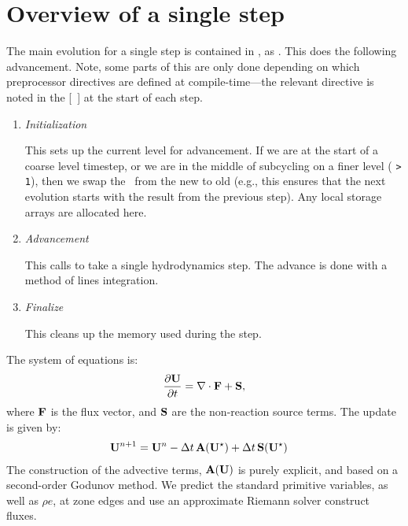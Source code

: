 
\section{Overview of a single step}
\label{flow:sec:nosdc}

The main evolution for a single step is contained in
, as .  This does
the following advancement.  Note, some parts of this are only done
depending on which preprocessor directives are defined at
compile-time---the relevant directive is noted in the [\ ] at the start
of each step.

\begin{enumerate}
\item {\em Initialization} 

  This sets up the current level for advancement.  If we are at the
  start of a coarse level timestep, or we are in the middle of
  subcycling on a finer level ( {\tt > 1}), then
  we swap the \statedata\ from the new to old (e.g., this ensures that
  the next evolution starts with the result from the previous step).
  Any local storage arrays are allocated here.

\item {\em Advancement} 

  This calls  to take a single hydrodynamics step.
  The advance is done with a method of lines integration.

\item {\em Finalize}

  This cleans up the memory used during the step.  

\end{enumerate}

The system of equations is:
\begin{equation}
\frac{\partial{\bf U}}{\partial t} = \nabla\cdot{\bf F} + {\bf S},
\end{equation}
where ${\bf F}$ is the flux vector, and ${\bf S}$ are the non-reaction source terms.
The update is given by:
\begin{align}
  {\bf U}^{n+1} &= {\bf U}^n - \Delta t\, {\bf A}({\bf U}^\star) + \Delta t\, {\bf S}({\bf U}^\star)
\end{align}
The construction of the advective terms, ${\bf A({\bf U})}$ is purely
explicit, and based on a second-order Godunov method.  We
predict the standard primitive variables, as well as $\rho e$, at
zone edges and use an approximate Riemann solver construct
fluxes.

